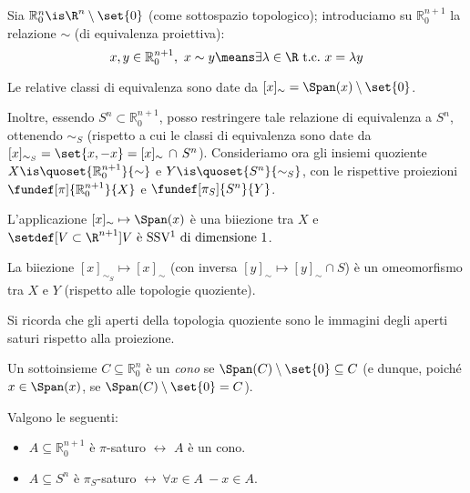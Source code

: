 

\newcommand*\Ps{\mathbb{P}} %
\newcommand*\Ro[1][n]{\mathbb{R}_0^{#1}} %
\newcommand*\tc{\ \text{t.c.} \ } %

Sia $\Ro \is \R^n \setminus \set{0}$ (come sottospazio topologico); introduciamo su $\Ro[n+1]$ la relazione $\sim $ (di equivalenza proiettiva): \[
x, y \in \Ro[n+1], \ x \sim y \means  \exists \lambda  \in  \R \tc x = \lambda y \]

Le relative classi di equivalenza sono date da $[x]_\sim = \Span(x) \setminus \set{0}$.

Inoltre, essendo $S^n \subset \Ro[n+1]$, posso restringere tale relazione di equivalenza a $S^n$, ottenendo $\sim_S$ (rispetto a cui le classi di equivalenza sono date da $[x]_{\sim_S} = \set{x, -x} = [x]_\sim \, \cap \, S^n$).
Consideriamo ora gli insiemi quoziente $X \is \quoset{\Ro[n+1]}{\sim}$ e $Y \is \quoset{S^n}{\sim_S}$, con le rispettive proiezioni $\fundef[\pi]{\Ro[n+1]}{X}$ e $\fundef[\pi_S]{S^n}{Y}$.

\begin{oss}
	L'applicazione $[x]_\sim  \mapsto  \Span(x)$ è una biiezione tra $X$ e \break
	$\setdef[V \subset \R^{n+1}]{V \text{ è SSV\footnotemark{} di dimensione 1}}$.
\end{oss}

\begin{prop}
	La biiezione $[x]_{\sim_S}  \mapsto  [x]_\sim$ (con inversa $[y]_\sim  \mapsto  [y]_\sim \cap S$) è un omeomorfismo tra $X$ e $Y$ (rispetto alle topologie quoziente).
\end{prop}

Si ricorda che gli aperti della topologia quoziente sono le immagini degli aperti saturi rispetto alla proiezione.

\begin{defn}[Cono]
	Un sottoinsieme $C\subseteq\Ro$ è un \emph{cono} se $\Span(C)\setminus\set{0}\subseteq C$ (e dunque, poiché $x\in\Span(x)$, se $\Span(C)\setminus\set{0}=C$).
\end{defn}
\begin{lemma}
	 Valgono le seguenti:
	\begin{itemize}
		\item $A \subseteq \Ro[n+1]$ è $\pi$-saturo $\leftrightarrow$ $A$ è un cono.
		\item $A \subseteq S^n$ è $\pi_S$-saturo $\leftrightarrow \, \forall x \in A \ -x \in A$.
	\end{itemize}
\end{lemma}

